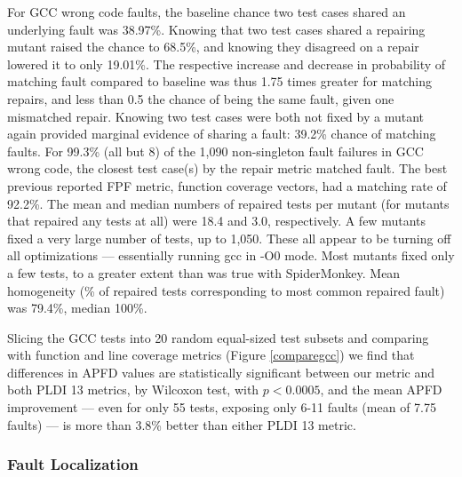 For GCC wrong code faults, the baseline chance two test cases shared an underlying fault was 38.97\%.  Knowing that two test cases shared a repairing mutant raised the chance to 68.5\%, and knowing they disagreed on a repair lowered it to only 19.01\%.  The respective increase and decrease in probability of matching fault compared to baseline was thus 1.75 times greater for matching repairs, and less than 0.5 the chance of being the same fault, given one mismatched repair.  Knowing two test cases were both not fixed by a mutant again provided marginal evidence of sharing a fault: 39.2\% chance of matching faults.
For 99.3\% (all but 8) of the 1,090 non-singleton fault failures in GCC wrong code, the closest test case(s) by the repair metric matched fault.  The best previous reported FPF metric, function coverage vectors, had a matching rate of 92.2\%.   The mean and median numbers of repaired tests per mutant (for mutants that repaired any tests at all) were 18.4 and 3.0, respectively.  A few mutants fixed a very large number of tests, up to 1,050.  These all appear to be turning off all optimizations --- essentially running gcc in -O0 mode.  Most mutants fixed only a few tests, to a greater extent than was true with SpiderMonkey.    Mean homogeneity (\% of repaired tests corresponding to most common repaired fault) was 79.4\%, median 100\%.

Slicing the GCC tests into 20 random equal-sized test subsets and comparing with function and line coverage metrics (Figure \ref{comparegcc}) we find that differences in APFD values are statistically significant between our metric and both PLDI 13 metrics, by Wilcoxon test, with $p < 0.0005$, and the mean APFD improvement --- even for only 55 tests, exposing only 6-11 faults (mean of 7.75 faults) --- is more than 3.8\% better than either PLDI 13 metric.


\subsubsection{Fault Localization}

